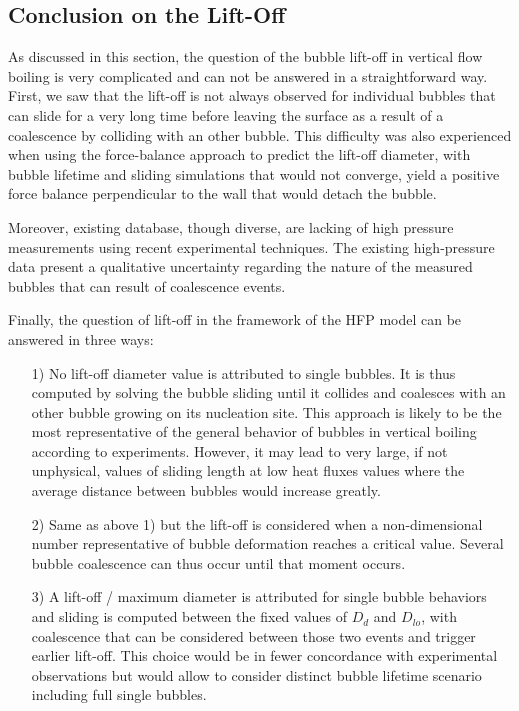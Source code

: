 \subsection{Conclusion on the Lift-Off}

As discussed in this section, the question of the bubble lift-off in vertical flow boiling is very complicated and can not be answered in a straightforward way. First, we saw that the lift-off is not always observed for individual bubbles that can slide for a very long time before leaving the surface as a result of a coalescence by colliding with an other bubble. This difficulty was also experienced when using the force-balance approach to predict the lift-off diameter, with bubble lifetime and sliding simulations that would not converge, \ie yield a positive force balance perpendicular to the wall that would detach the bubble. 

\npar

Moreover, existing database, though diverse, are lacking of high pressure measurements using recent experimental techniques. The existing high-pressure data present a qualitative uncertainty regarding the nature of the measured bubbles that can result of coalescence events.

\npar

Finally, the question of lift-off in the framework of the HFP model can be answered in three ways:

\begin{enumerate}
\item[1)] No lift-off diameter value is attributed to single bubbles.  It is thus computed by solving the bubble sliding until it collides and coalesces with an other bubble growing on its nucleation site. This approach is likely to be the most representative of the general behavior of bubbles in vertical boiling according to experiments. However, it may lead to very large, if not unphysical, values of sliding length at low heat fluxes values where the average distance between bubbles would increase greatly.

\item[2)] Same as above 1) but the lift-off is considered when a non-dimensional number representative of bubble deformation reaches a critical value. Several bubble coalescence can thus occur until that moment occurs.

\item[3)] A lift-off / maximum diameter is attributed for single bubble behaviors and sliding is computed between the fixed values of $D_{d}$ and $D_{lo}$, with coalescence that can be considered between those two events and trigger earlier lift-off. This choice would be in fewer concordance with experimental observations but would allow to consider distinct bubble lifetime scenario including full single bubbles.
\end{enumerate}



